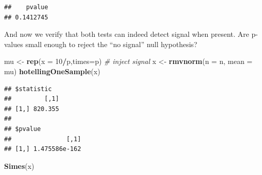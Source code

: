 \documentclass[]{book}
\newenvironment{Shaded}{\begin{snugshade}}{\end{snugshade}}
\newcommand{\CommentTok}[1]{\textcolor[rgb]{0.56,0.35,0.01}{\textit{#1}}}
\newcommand{\ControlFlowTok}[1]{\textcolor[rgb]{0.13,0.29,0.53}{\textbf{#1}}}
\newcommand{\DataTypeTok}[1]{\textcolor[rgb]{0.13,0.29,0.53}{#1}}
\newcommand{\DecValTok}[1]{\textcolor[rgb]{0.00,0.00,0.81}{#1}}
\newcommand{\KeywordTok}[1]{\textcolor[rgb]{0.13,0.29,0.53}{\textbf{#1}}}
\newcommand{\NormalTok}[1]{#1}
\newcommand{\OperatorTok}[1]{\textcolor[rgb]{0.81,0.36,0.00}{\textbf{#1}}}
\newcommand{\StringTok}[1]{\textcolor[rgb]{0.31,0.60,0.02}{#1}}
\theoremstyle{definition}
\theoremstyle{definition}
\theoremstyle{definition}
\theoremstyle{remark}
\begin{document}
\begin{Shaded}
\end{Shaded}

\begin{verbatim}
##    pvalue 
## 0.1412745
\end{verbatim}

And now we verify that both tests can indeed detect signal when present. Are p-values small enough to reject the ``no signal'' null hypothesis?

\begin{Shaded}
\begin{Highlighting}[]
\NormalTok{mu <-}\StringTok{ }\KeywordTok{rep}\NormalTok{(}\DataTypeTok{x =} \DecValTok{10}\OperatorTok{/}\NormalTok{p,}\DataTypeTok{times=}\NormalTok{p) }\CommentTok{# inject signal}
\NormalTok{x <-}\StringTok{ }\KeywordTok{rmvnorm}\NormalTok{(}\DataTypeTok{n =}\NormalTok{ n, }\DataTypeTok{mean =}\NormalTok{ mu)}
\KeywordTok{hotellingOneSample}\NormalTok{(x)}
\end{Highlighting}
\end{Shaded}

\begin{verbatim}
## $statistic
##         [,1]
## [1,] 820.355
## 
## $pvalue
##               [,1]
## [1,] 1.475586e-162
\end{verbatim}

\begin{Shaded}
\begin{Highlighting}[]
\KeywordTok{Simes}\NormalTok{(x)}
\end{Highlighting}
\end{Shaded}
\end{document}
